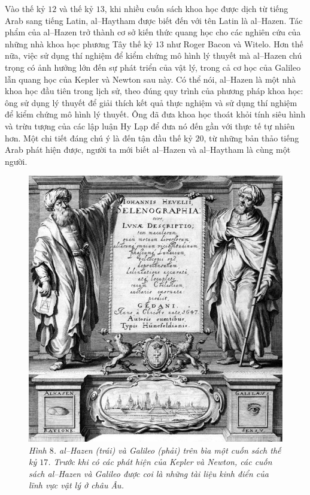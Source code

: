 \begin{multicols}{2}
	Vào thế kỷ $12$ và thế kỷ $13$, khi nhiều cuốn sách khoa học được dịch từ tiếng Arab sang tiếng Latin, al--Haytham được biết đến với tên Latin là al--Hazen. Tác phẩm của al--Hazen trở thành cơ sở kiến thức quang học cho các nghiên cứu của những nhà khoa học phương Tây thế kỷ $13$ như Roger Bacon và Witelo. Hơn thế nữa, việc sử dụng thí nghiệm để kiểm chứng mô hình lý thuyết mà al--Hazen chú trọng có ảnh hưởng lớn đến sự phát triển của vật lý, trong cả cơ học của Galileo lẫn quang học của Kepler và Newton sau này. Có thể nói, al--Hazen là một nhà khoa học đầu tiên trong lịch sử, theo đúng quy trình của phương pháp khoa học: ông sử dụng lý thuyết để giải thích kết quả thực nghiệm và sử dụng thí nghiệm để kiểm chứng mô hình lý thuyết. Ông đã đưa khoa học thoát khỏi tính siêu hình và trừu tượng của các lập luận Hy Lạp để đưa nó đến gần với thực tế tự nhiên hơn. Một chi tiết đáng chú ý là đến tận đầu thế kỷ $20$, từ những bản thảo tiếng Arab phát hiện được, người ta mới biết al--Hazen và al--Haytham là cùng một người.
	\begin{figure}[H]
		\vspace*{5pt}
		\centering
		\captionsetup{labelformat= empty, justification=centering}
		\includegraphics[width= 1\linewidth]{9}
		\caption{\small\textit{\color{lichsutoanhoc}Hình $8$. al--Hazen (trái) và Galileo (phải) trên bìa một cuốn sách thế kỷ $17$. Trước khi có các phát hiện của Kepler và Newton, các cuốn sách al--Hazen và Galileo được coi là những tài liệu kinh điển của lĩnh vực vật lý ở châu Âu.}}

\end{figure}
\end{multicols}
